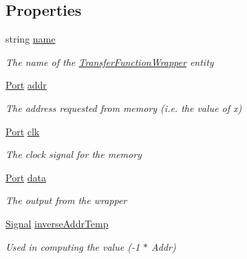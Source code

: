 \subsection*{Properties}
\begin{DoxyCompactItemize}
\item 
string \hyperlink{class_n_n_gen_1_1_transfer_function_wrapper_a06c250469e511bdca837875720dbf5e9}{name}
\begin{DoxyCompactList}\small\item\em The name of the \hyperlink{class_n_n_gen_1_1_transfer_function_wrapper}{Transfer\+Function\+Wrapper} entity \end{DoxyCompactList}\item 
\hyperlink{class_n_n_gen_1_1_port}{Port} \hyperlink{class_n_n_gen_1_1_transfer_function_wrapper_a0b1bd686fd58589ecee085e57596d2e7}{addr}
\begin{DoxyCompactList}\small\item\em The address requested from memory (i.\+e. the value of x) \end{DoxyCompactList}\item 
\hyperlink{class_n_n_gen_1_1_port}{Port} \hyperlink{class_n_n_gen_1_1_transfer_function_wrapper_a4db456cd0b50d330f6b221032d35cc81}{clk}
\begin{DoxyCompactList}\small\item\em The clock signal for the memory \end{DoxyCompactList}\item 
\hyperlink{class_n_n_gen_1_1_port}{Port} \hyperlink{class_n_n_gen_1_1_transfer_function_wrapper_a8898d56d022ccf0311e4cf7ed3ec138a}{data}
\begin{DoxyCompactList}\small\item\em The output from the wrapper \end{DoxyCompactList}\item 
\hyperlink{class_n_n_gen_1_1_signal}{Signal} \hyperlink{class_n_n_gen_1_1_transfer_function_wrapper_ac952bf20fb4cef97074cadcb2971b1bd}{inverse\+Addr\+Temp}
\begin{DoxyCompactList}\small\item\em Used in computing the value (-\/1 $\ast$ Addr) \end{DoxyCompactList}\item 

\end{DoxyCompactItemize}
